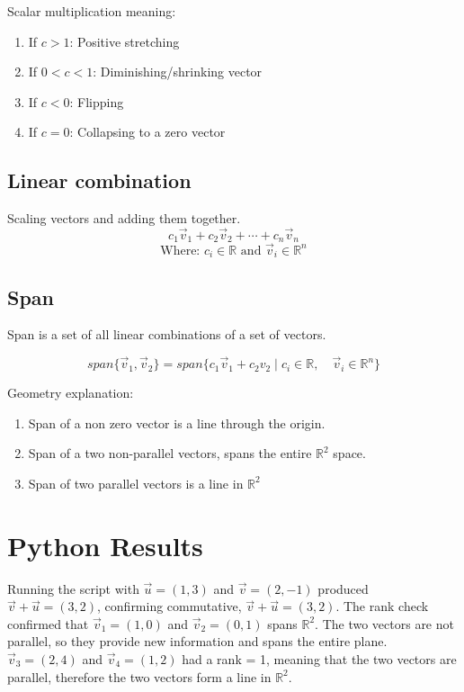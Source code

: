 \documentclass[11pt]{article}
\begin{document}
Scalar multiplication meaning:
\begin{enumerate}
	\item If $c > 1$: Positive stretching
	\item If $0 < c < 1$: Diminishing/shrinking vector
	\item If $c < 0$: Flipping
	\item If $c = 0$: Collapsing to a zero vector
\end{enumerate}	

	\subsection{Linear combination}
	Scaling vectors and adding them together. 
	\[
		c_1\vec v_1 + c_2\vec v_2 + \cdots + c_n \vec v_n	
	\]
	\[
		\text{Where: }	c_i \in \mathbb{R} \text{ and } \vec v_i \in \mathbb{R}^n
	\]
	
	\subsection{Span}
	Span is a set of all linear combinations of a set of vectors.
	
	\[
		span\{\vec v_1 , \vec v_2\} = span \{c_1 \vec v_1 + c_2 v_2\mid c_i \in \mathbb{R}, \quad \vec v_i \in \mathbb{R}^n\}	
	\]
	
Geometry explanation:
\begin{enumerate}
	\item Span of a non zero vector is a line through the origin.
	\item Span of a two non-parallel vectors,  spans the entire $\mathbb{R}^2$ space.
	\item Span of two parallel vectors is a line in $\mathbb{R}^2$
\end{enumerate}
	\section{Python Results}
	Running the script with $\vec u = (1, 3)$ and $\vec v = (2, -1)$ produced $\vec v + \vec u  =  (3, 2)$, confirming commutative, $\vec v + \vec u = (3,2)$. The rank check confirmed that $\vec v_1 = (1,0)$ and $\vec v_2 = (0,1)$ spans $\mathbb{R}^2$. The two vectors are not parallel, so they provide new information and spans the entire plane. $\vec v_3 = (2, 4)$ and $\vec v_4 = (1,2)$ had a rank = 1, meaning that the two vectors are parallel, therefore the two vectors form a line in  $\mathbb{R}^2$.
	
\end{document}
